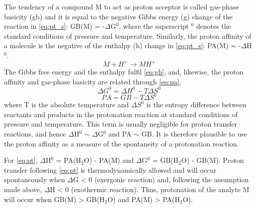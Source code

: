 The tendency of a compound M to act as proton acceptor is called gas-phase basicity (\acrshort{gb}) and it is equal to the negative Gibbs energy (\acrshort{g}) change of the  reaction in \autoref{eq:pt_s}: GB(M) = -$\Delta$G$^0$, where the superscript $^0$ denotes the standard conditions of pressure and temperature. Similarly, the proton affinity of a molecule is the negative of the enthalpy (\acrshort{h}) change in \autoref{eq:pt_s}: PA(M) = -$\Delta$H$^0$.
%
\begin{equation}
\label{eq:pt_s}
M + H^+  \rightarrow MH^+
\end{equation}
%
The Gibbs free energy and the enthalpy fulfil \autoref{eq:gh}, and, likewise, the proton affinity and gas-phase basicity are related through \autoref{eq:pa},
%
\begin{equation}
\label{eq:gh}
\Delta G^0 = \Delta H^0 - T\Delta S^0
\end{equation}
%
\begin{equation}
\label{eq:pa}
PA = GB - T\Delta S^0
\end{equation}
where T is the absolute temperature and $\Delta S^0$ is the entropy difference between reactants and products in the protonation reaction at standard conditions of pressure and temperature.
This term  is usually negligible for  proton transfer reactions, and hence $\Delta$H$^0$ $\sim$ $\Delta$G$^0$ and PA $\sim$ GB.
It is therefore plausible to use the proton affinity as a measure of the spontaneity of a protonation reaction.

For \autoref{eq:pt}, $\Delta$H$^0$ = PA(H$_2$O) - PA(M) and $\Delta$G$^0$ = GB(H$_2$O) - GB(M).
Proton transfer following \autoref{eq:pt} is thermodynamically allowed and will occur spontaneously when  $\Delta$G < 0 (exergonic reaction) and, following the assumption made above, $\Delta$H < 0 (exothermic reaction). Thus, protonation of the analyte M will occur when
GB(M) > GB(H$_2$O)
and
PA(M) > PA(H$_2$O).







